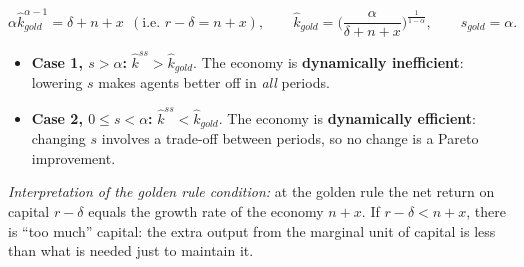 \begin{keybox}[title=Golden rule and dynamic efficiency]
\[
\alpha\hat k_{gold}^{\alpha-1}=\delta+n+x\ \ (\text{i.e. } r-\delta=n+x),\qquad
\hat k_{gold}=\Big(\frac{\alpha}{\delta+n+x}\Big)^{\frac1{1-\alpha}},\qquad s_{gold}=\alpha .
\]
\begin{itemize}
  \item \textbf{Case 1, $s>\alpha$:} $\hat k^{ss}>\hat k_{gold}$. The economy is \textbf{dynamically inefficient}: lowering $s$ makes agents better off in \emph{all} periods.
  \item \textbf{Case 2, $0\le s<\alpha$:} $\hat k^{ss}<\hat k_{gold}$. The economy is \textbf{dynamically efficient}: changing $s$ involves a trade-off between periods, so no change is a Pareto improvement.
\end{itemize}
\end{keybox}
\textit{Interpretation of the golden rule condition:} at the golden rule the net return on capital $r-\delta$ equals the growth rate of the economy $n+x$. If $r-\delta<n+x$, there is ``too much'' capital: the extra output from the marginal unit of capital is less than what is needed just to maintain it.

